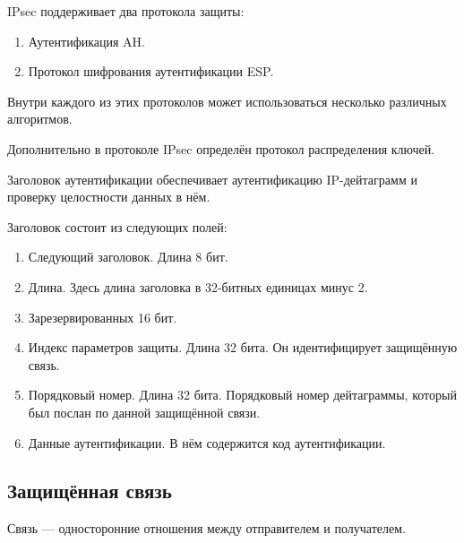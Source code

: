 \documentclass[12pt, russian, oneside, article]{ncc}
\begin{document}
IPsec поддерживает два протокола защиты:
\begin{enumerate}
\item Аутентификация AH.
\item Протокол шифрования аутентификации ESP.
\end{enumerate}

Внутри каждого из этих протоколов может использоваться несколько различных алгоритмов.

Дополнительно в протоколе IPsec определён протокол распределения ключей.

Заголовок аутентификации обеспечивает аутентификацию IP-дейтаграмм и проверку целостности данных в нём.

Заголовок состоит из следующих полей:
\begin{enumerate}
\item Следующий заголовок. Длина 8 бит.
\item Длина. Здесь длина заголовка в 32-битных единицах минус 2.
\item Зарезервированных 16 бит.
\item Индекс параметров защиты. Длина 32 бита. Он идентифицирует защищённую связь.
\item Порядковый номер. Длина 32 бита. Порядковый номер дейтаграммы, который был послан по данной защищённой связи.
\item Данные аутентификации. В нём содержится код аутентификации.
\end{enumerate}
\subsection{Защищённая связь}
\label{sec-4_1}


Связь --- односторонние отношения между отправителем и получателем.
\end{document}
